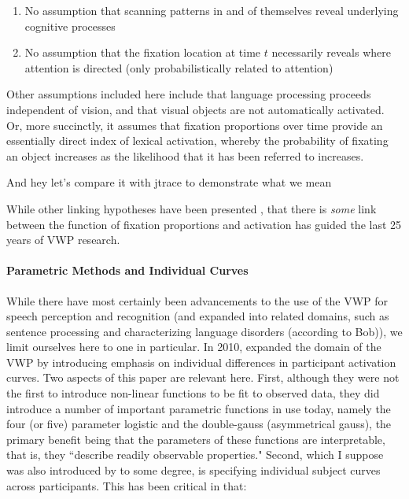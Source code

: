 \begin{enumerate}
\item No assumption that scanning patterns in and of themselves reveal underlying cognitive processes
\item No assumption that the fixation location at time $t$ necessarily reveals where attention is directed (only probabilistically related to attention)
\end{enumerate}


Other assumptions included here include that language processing proceeds independent of vision, and that visual objects are not automatically activated. Or, more succinctly, it assumes that fixation proportions over time provide an essentially direct index of lexical activation, whereby the probability of fixating an object increases as the likelihood that it has been referred to increases.

And hey let's compare it with jtrace to demonstrate what we mean \citep{Strauss2007}



While other linking hypotheses have been presented \citep{Magnuson2019}, that there is \textit{some} link between the function of fixation proportions and activation has guided the last 25 years of VWP research.




\paragraph{Parametric Methods and Individual Curves} While there have most certainly been advancements to the use of the VWP for speech perception and recognition (and expanded into related domains, such as sentence processing and characterizing language disorders (according to Bob)), we  limit ourselves here to one in particular. In 2010, \citet{mcmurray2010individual} expanded the domain of the VWP by introducing emphasis on individual differences in participant activation curves. Two aspects of this paper are relevant here. First, although they were not the first to introduce non-linear functions to be fit to observed data, they did introduce a number of important parametric functions in use today, namely the four (or five) parameter logistic and the double-gauss (asymmetrical gauss), the primary benefit being that the parameters of these functions are interpretable, that is, they ``describe readily observable properties." Second, which I suppose was also introduced by \citet{Mirman2008} to some degree, is specifying individual subject curves across participants. This has been critical in that:

